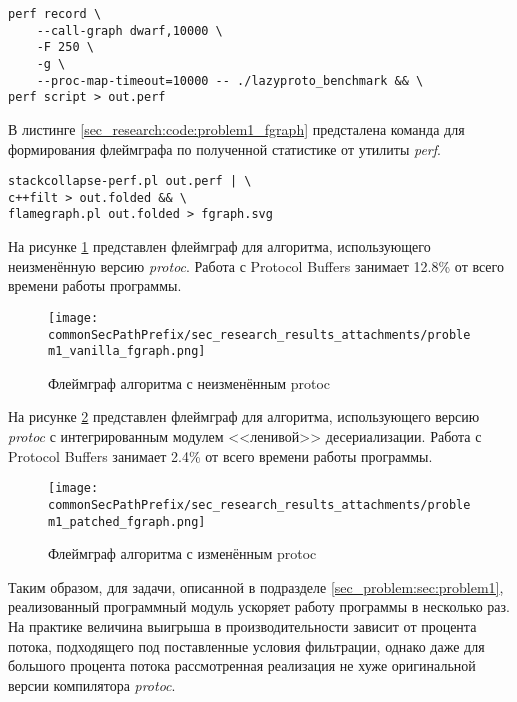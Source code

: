 \noindent\begin{minipage}{\linewidth}
\begin{lstlisting}[style=CodeListing, caption={bash-инструкция для сбора статистики утилитой perf}, label=sec_research:code:problem1_perf]
perf record \
    --call-graph dwarf,10000 \
    -F 250 \
    -g \
    --proc-map-timeout=10000 -- ./lazyproto_benchmark && \
perf script > out.perf
\end{lstlisting}
\end{minipage}

В листинге \ref{sec_research:code:problem1_fgraph} предсталена команда для формирования флеймграфа по полученной статистике от утилиты \textit{perf}.

\noindent\begin{minipage}{\linewidth}
\begin{lstlisting}[style=CodeListing, caption={bash-инструкция для сбора статистики утилитой perf}, label=sec_research:code:problem1_fgraph]
stackcollapse-perf.pl out.perf | \
c++filt > out.folded && \
flamegraph.pl out.folded > fgraph.svg
\end{lstlisting}
\end{minipage}

На рисунке \ref{fig:problem1_vanilla_fgraph} представлен флеймграф для алгоритма, использующего неизменённую версию \textit{protoc}. 
Работа с Protocol Buffers занимает 12.8\% от всего времени работы программы.

\begin{figure}[ht]
    \centering
    \texttt{[image: \\commonSecPathPrefix/sec\_research\_results\_attachments/problem1\_vanilla\_fgraph.png]}
    \caption{Флеймграф алгоритма с неизменённым protoc}
    \label{fig:problem1_vanilla_fgraph}
\end{figure}

На рисунке \ref{fig:problem1_patched_fgraph} представлен флеймграф для алгоритма, использующего версию \textit{protoc} с интегрированным модулем <<ленивой>> десериализации. 
Работа с Protocol Buffers занимает 2.4\% от всего времени работы программы.

\begin{figure}[ht]
    \centering
    \texttt{[image: \\commonSecPathPrefix/sec\_research\_results\_attachments/problem1\_patched\_fgraph.png]}
    \caption{Флеймграф алгоритма с изменённым protoc}
    \label{fig:problem1_patched_fgraph}
\end{figure}

Таким образом, для задачи, описанной в подразделе \ref{sec_problem:sec:problem1}, реализованный программный модуль ускоряет работу программы в несколько раз.
На практике величина выигрыша в производительности зависит от процента потока, подходящего под поставленные условия фильтрации, однако даже для большого процента потока
рассмотренная реализация не хуже оригинальной версии компилятора \textit{protoc}.

